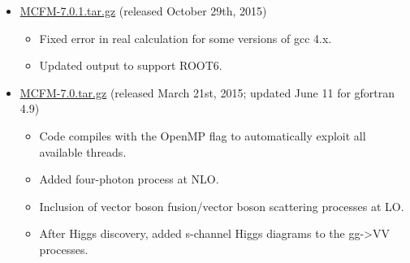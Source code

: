 \begin{itemize}
\item \href{https://mcfm.fnal.gov/downloads/MCFM-7.0.1.tar.gz}{MCFM-7.0.1.tar.gz} (released October 29th, 2015)

\begin{itemize}
\item    Fixed error in real calculation for some versions of gcc 4.x.
\item   Updated output to support ROOT6.
\end{itemize}

\item \href{https://mcfm.fnal.gov/downloads/MCFM-7.0.tar.gz}{MCFM-7.0.tar.gz} (released March 21st, 2015; updated June 11 for gfortran 4.9)

\begin{itemize}
\item    Code compiles with the OpenMP flag to automatically exploit all available threads.
\item    Added four-photon process at NLO.
\item    Inclusion of vector boson fusion/vector boson scattering processes at LO.
\item    After Higgs discovery, added s-channel Higgs diagrams to the gg->VV processes.
\end{itemize}
\end{itemize}
